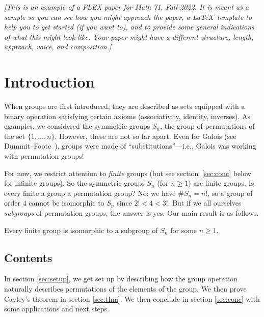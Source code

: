 \documentclass[11pt, reqno]{amsart}
\begin{document}
\setlength{\headheight}{13.0pt}
\setlength{\footskip}{13.0pt}

\bigskip

\date{\today}

\maketitle

\emph{
  [This is an example of a FLEX paper for Math 71, Fall 2022.
  It is meant as a sample so you can see how you might approach the paper,
  a \LaTeX\ template to help you to get started (if you want to),
  and to provide some general indications of what this might look like.
  Your paper might have a different structure, length, approach, voice, and composition.]
}

\section{Introduction}\label{sec:intro}

When groups are first introduced, they are described as sets equipped with a binary operation
satisfying certain axioms (associativity, identity, inverses).
As examples, we considered the symmetric groups $S_n$, the group of permutations of the set $\{1,\dots,n\}$.  However, these are not so far apart.  Even for Galois (see Dummit--Foote~\cite[p.~14 (3)]{DummitFoote}), groups were made of ``substitutions''---i.e., Galois was working with permutation groups!  

For now, we restrict attention to \emph{finite} groups (but see section~\ref{sec:conc} below for infinite groups).  So the symmetric groups $S_n$ (for $n \geq 1$) are finite groups.  Is every finite a group a permutation group?  No: we have $\#S_n=n!$, so a group of order $4$ cannot be isomorphic to $S_n$ since $2! < 4 < 3!$.  But if we all ourselves \emph{subgroups} of permutation groups, the answer is yes.  Our main result is as follows.

\begin{thm}[Cayley] \label{thm:cayley}
Every finite group is isomorphic to a subgroup of $S_n$ for some $n \geq 1$.
\end{thm}

\subsection*{Contents} In section \ref{sec:setup}, we get set up by describing how the group operation naturally describes permutations of the elements of the group.  We then prove Cayley's theorem in section \ref{sec:thm}.  We then conclude in section \ref{sec:conc} with some applications and next steps.
\end{document}
